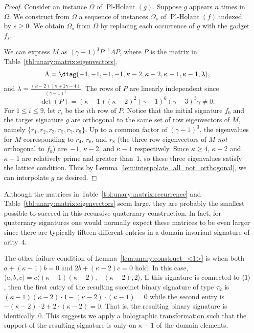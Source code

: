\documentclass[11pt]{article}
\newcommand{\PlHolant}{\operatorname{Pl-Holant}}
\newenvironment{remark}{\medskip{\bfseries \noindent Remark:}}{\par\medskip}{\par\medskip}
\begin{document}
\begin{proof}
 Consider an instance $\Omega$ of $\PlHolant(g)$.
 Suppose $g$ appears $n$ times in $\Omega$.
 We construct from $\Omega$ a sequence of instances $\Omega_s$ of $\PlHolant(f)$ indexed by $s \ge 0$.
 We obtain $\Omega_s$ from $\Omega$ by replacing each occurrence of $g$ with the gadget $f_s$.
 
 We can express $M$ as $(\gamma - 1)^3 P^{-1} \Lambda P$,
 where $P$ is the matrix in Table~\ref{tbl:unary:matrix:eigenvectors},
 \[
  \Lambda = \diag(-1, -1, -1, -1, \kappa - 2, \kappa - 2, \kappa - 1, \kappa - 1, \lambda),
 \]
 and $\lambda = \frac{(\kappa - 2) (\kappa + 2 \gamma - 4)}{(\gamma - 1)^2}$.
 The rows of $P$ are linearly independent since
 \[
  \det(P) = (\kappa - 1) (\kappa - 2)^2 (\gamma - 1)^6 (\gamma - 3)^3 \gamma \ne 0.
 \]
 For $1 \le i \le 9$,
 let $r_i$ be the $i$th row of $P$.
 Notice that the initial signature $f_0$ and the target signature $g$ are orthogonal to the same set of row eigenvectors of $M$,
 namely $\{r_1, r_2, r_3, r_5, r_7, r_9\}$.
 Up to a common factor of $(\gamma - 1)^3$,
 the eigenvalues for $M$ corresponding to $r_4$, $r_6$, and $r_8$
 (the three row eigenvectors of $M$ \emph{not} orthogonal to $f_0$)
 are~$-1$, $\kappa - 2$, and $\kappa - 1$ respectively.
 Since $\kappa \ge 4$,
 $\kappa - 2$ and $\kappa - 1$ are relatively prime and greater than~$1$,
 so these three eigenvalues satisfy the lattice condition.
 Thus by Lemma~\ref{lem:interpolate_all_not_orthogonal},
 we can interpolate $g$ as desired.
\end{proof}

\begin{remark}
 Although the matrices in Table~\ref{tbl:unary:matrix:recurrence} and Table~\ref{tbl:unary:matrix:eigenvectors} seem large,
 they are probably the smallest possible to succeed in this recursive quaternary construction.
 In fact, for quaternary signatures one would normally expect these matrices to be even larger since there are typically fifteen different entries in a domain invariant signature of arity~$4$.
\end{remark}

The other failure condition of Lemma~\ref{lem:unary:construct_<1>} is when both $a + (\kappa - 1) b = 0$ and $2 b + (\kappa - 2) c = 0$ hold.
In this case,
$\langle a,b,c \rangle = c \langle (\kappa - 1) (\kappa - 2), -(\kappa - 2), 2 \rangle$.
If this signature is connected to $\langle 1 \rangle$,
then the first entry of the resulting succinct binary signature of type $\tau_2$ is $(\kappa - 1) (\kappa - 2) \cdot 1 - (\kappa - 2) \cdot (\kappa - 1) = 0$
while the second entry is $-(\kappa - 2) \cdot 2 + 2 \cdot (\kappa - 2) = 0$.
That is, the resulting binary signature is identically~$0$.
This suggests we apply a holographic transformation such that the support of the resulting signature is only on $\kappa - 1$ of the domain elements.
\end{document}
